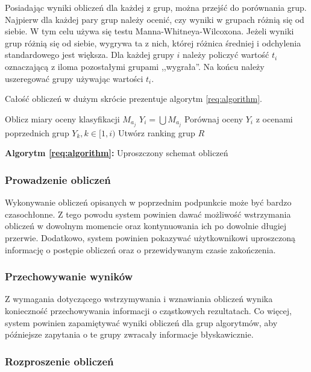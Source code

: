 \documentclass[../thesis.tex]{subfiles}
\begin{document}
Posiadając wyniki obliczeń dla każdej z grup, można przejść do porównania grup. Najpierw dla każdej pary grup należy ocenić, czy wyniki w grupach różnią się od siebie. W tym celu używa się testu Manna-Whitneya-Wilcoxona. Jeżeli wyniki grup różnią się od siebie, wygrywa ta z nich, której różnica średniej i odchylenia standardowego jest większa. Dla każdej grupy $i$ należy policzyć wartość $t_i$ oznaczającą z iloma pozostałymi grupami ,,wygrała''. Na końcu należy uszeregować grupy używając wartości $t_i$.

Całość obliczeń w dużym skrócie prezentuje algorytm \ref{req:algorithm}.

\begin{algorithm}[ht]
   {
     {
      Oblicz miary oceny klasyfikacji $M_{a_j}$\;
    }
    $Y_i = \bigcup M_{a_j}$\;
    Porównaj oceny $Y_i$ z ocenami poprzednich grup $Y_k, k \in [1, i)$\;
  }
  Utwórz ranking grup $R$\;
  \caption{\textbf{Algorytm \ref{req:algorithm}:} Uproszczony schemat obliczeń}
  \label{req:algorithm}
\end{algorithm}

\subsubsection{Prowadzenie obliczeń}

Wykonywanie obliczeń opisanych w poprzednim podpunkcie może być bardzo czasochłonne. Z tego powodu system powinien dawać możliwość wstrzymania obliczeń w dowolnym momencie oraz kontynuowania ich po dowolnie długiej przerwie. Dodatkowo, system powinien pokazywać użytkownikowi uproszczoną informację o postępie obliczeń oraz o przewidywanym czasie zakończenia.

\subsubsection{Przechowywanie wyników}

Z wymagania dotyczącego wstrzymywania i wznawiania obliczeń wynika konieczność przechowywania informacji o cząstkowych rezultatach. Co więcej, system powinien zapamiętywać wyniki obliczeń dla grup algorytmów, aby późniejsze zapytania o te grupy zwracały informacje błyskawicznie.

\subsubsection{Rozproszenie obliczeń}
\end{document}
